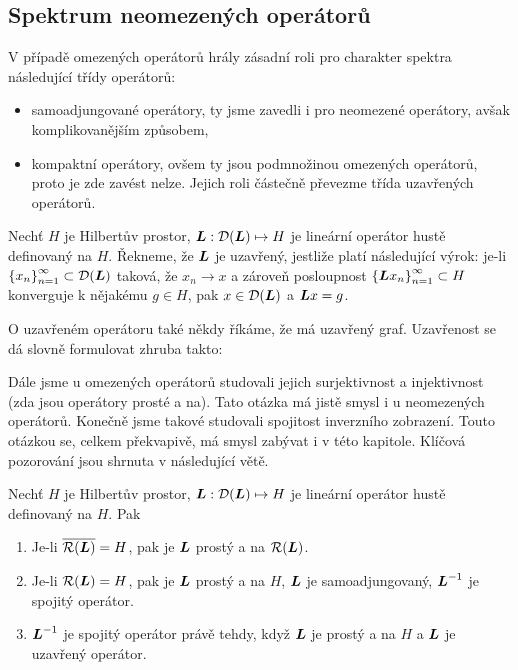 \subsection{Spektrum neomezených operátorů}

V případě omezených operátorů hrály zásadní roli pro charakter spektra následující třídy operátorů: \begin{itemize}
    \item samoadjungované operátory, ty jsme zavedli i pro neomezené operátory, avšak komplikovanějším způsobem,
    \item kompaktní operátory, ovšem ty jsou podmnožinou omezených operátorů, proto je zde zavést nelze. Jejich roli částečně převezme třída uzavřených operátorů.
\end{itemize}

\begin{definition}
Nechť $H$ je Hilbertův prostor, $\boldsymbol{L} : \mathcal{D}(\boldsymbol{L}) \mapsto H$ je lineární operátor hustě definovaný na $H$.  Řekneme, že $\boldsymbol{L}$ je uzavřený, jestliže platí následující výrok: je-li $\left \lbrace x_n \right \rbrace_{n=1}^\infty \subset \mathcal{D}(\boldsymbol{L}) $ taková, že $x_n \rightarrow x$ a zároveň posloupnost $\left \lbrace \boldsymbol{L} x_n \right \rbrace_{n=1}^\infty \subset H$ konverguje k nějakému $g \in H$, pak $x \in \mathcal{D}(\boldsymbol{L})$ a $\boldsymbol{L} x =g$.
\end{definition}

\begin{remark}
O uzavřeném operátoru také někdy říkáme, že má uzavřený graf. Uzavřenost se dá slovně formulovat zhruba takto: 
\end{remark}

Dále jsme u omezených operátorů studovali jejich surjektivnost a injektivnost (zda jsou operátory prosté a na). Tato otázka má jistě smysl i u neomezených operátorů. Konečně jsme takové studovali spojitost inverzního zobrazení. Touto otázkou se, celkem překvapivě, má smysl zabývat i v této kapitole. Klíčová pozorování jsou shrnuta v následující větě.

\begin{theorem}
Nechť $H$ je Hilbertův prostor, $\boldsymbol{L} : \mathcal{D}(\boldsymbol{L}) \mapsto H$ je lineární operátor hustě definovaný na $H$. Pak \begin{enumerate}
    \item Je-li $\overline{\mathcal{R}(\boldsymbol{L})} = H$, pak je $\boldsymbol{L}$ prostý a na $\mathcal{R} (\boldsymbol{L})$.
    \item Je-li $\mathcal{R}(\boldsymbol{L}) = H$, pak je $\boldsymbol{L}$ prostý a na $H$, $\boldsymbol{L}$ je samoadjungovaný, $\boldsymbol{L}^{-1}$ je spojitý operátor.
    \item $\boldsymbol{L}^{-1}$ je spojitý operátor právě tehdy, když $\boldsymbol{L}$ je prostý a na $H$ a $\boldsymbol{L}$ je uzavřený operátor.
\end{enumerate} 
\end{theorem}

